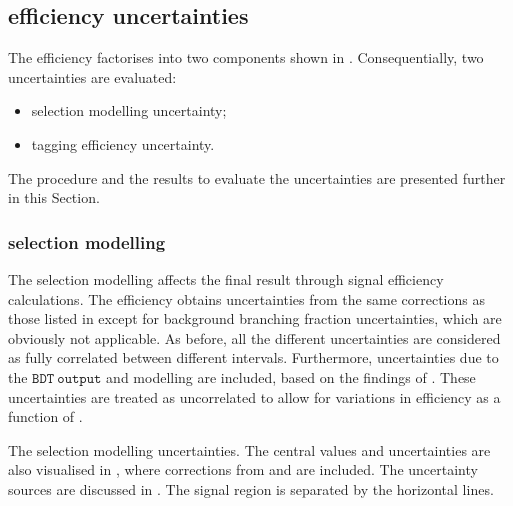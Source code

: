 \subsection{\texorpdfstring{\BtoXsgamma}{B->Xs gamma} efficiency uncertainties}\label{sec:signal_selection_uncertainties}

The \BtoXsgamma efficiency factorises into two components shown in .
Consequentially, two uncertainties are evaluated:
\begin{itemize}
    \item \BtoXsgamma selection modelling uncertainty;
    \item \BtoXsgamma tagging efficiency uncertainty.
\end{itemize}
The procedure and the results to evaluate the uncertainties are presented further in this Section.

\subsubsection{\texorpdfstring{\BtoXsgamma}{B->Xs gamma} selection modelling}

The \BtoXsgamma selection modelling affects the final result through signal efficiency calculations.
The efficiency obtains uncertainties from the same corrections as those listed in  
except for background branching fraction uncertainties, which are obviously not applicable.
As before, all the different uncertainties are considered as fully correlated between different \EB intervals.
Furthermore, uncertainties due to the $\mathtt{BDT~output}$ and \ZMVA modelling are included, based on the findings of .
These uncertainties are treated as uncorrelated to allow for variations in efficiency as a function of \EB.

\begin{table}[htbp!]
    \centering
    \caption{\label{tab:signal_selection_uncertainties}
    The \BtoXsgamma selection modelling uncertainties.
    The central values and uncertainties are also visualised in ,
    where corrections from  and  are included.
    The uncertainty sources are discussed in .
    The signal region is separated by the horizontal lines.
    }
    
\end{table}

